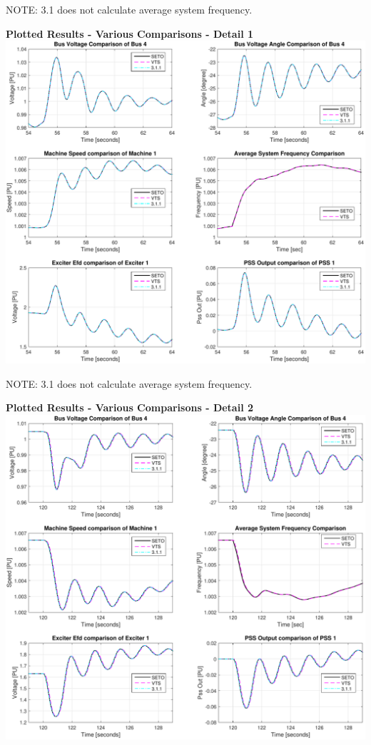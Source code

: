 NOTE: 3.1 does not calculate average system frequency.

\pagebreak
\textbf{Plotted Results - Various Comparisons - Detail 1} \ \\
\includegraphics[width=\linewidth]{examples/extendedTerm/verCompDetail1}

NOTE: 3.1 does not calculate average system frequency.

\pagebreak
\textbf{Plotted Results - Various Comparisons - Detail 2} \ \\
\includegraphics[width=\linewidth]{examples/extendedTerm/verCompDetail2}

